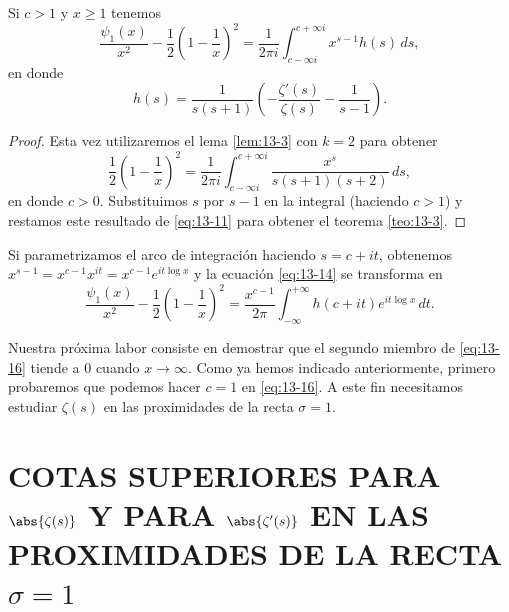     \begin{teorema}\label{teo:13-3}
        Si $c>1$ y $x\geq1$ tenemos
        \begin{equation}\label{eq:13-14}
            \frac{\psi_1(x)}{x^2}-\frac{1}{2}\left(1-\frac{1}{x}\right)^2=\frac{1}{2\pi i}\int_{c-\infty i}^{c+\infty i}x^{s-1}h(s)\,ds,
        \end{equation}
        en donde
        \begin{equation}\label{eq:13-15}
            h(s)=\frac{1}{s(s+1)}\left(-\frac{\zeta'(s)}{\zeta(s)}-\frac{1}{s-1}\right).
        \end{equation}
    \end{teorema}

    \begin{proof}
        Esta vez utilizaremos el lema \ref{lem:13-3} con $k=2$ para obtener
        \begin{equation*}
            \frac{1}{2}\left(1-\frac{1}{x}\right)^2=\frac{1}{2\pi i}\int_{c-\infty i}^{c+\infty i}\frac{x^s}{s(s+1)(s+2)}\,ds,
        \end{equation*}
        en donde $c>0$. Substituimos $s$ por $s-1$ en la integral (haciendo $c>1$) y restamos
        este resultado de \eqref{eq:13-11} para obtener el teorema \ref{teo:13-3}.
    \end{proof}

    Si parametrizamos el arco de integración haciendo $s=c+it$, obtenemos
    $x^{s-1}=x^{c-1}x^{it}=x^{c-1}e^{it\log x}$ y la ecuación \eqref{eq:13-14} se transforma
    en
    \begin{equation}\label{eq:13-16}
        \frac{\psi_1(x)}{x^2}-\frac{1}{2}\left(1-\frac{1}{x}\right)^2=\frac{x^{c-1}}{2\pi}\int_{-\infty}^{+\infty}h(c+it)e^{it\log x}\,dt.
    \end{equation}

    Nuestra próxima labor consiste en demostrar que el segundo miembro de
    \eqref{eq:13-16} tiende a 0 cuando $x\to\infty$. Como ya hemos indicado anteriormente,
    primero probaremos que podemos hacer $c=1$ en \eqref{eq:13-16}. A este fin necesitamos
    estudiar $\zeta(s)$ en las proximidades de la recta $\sigma=1$.

    \section[COTAS SUPERIORES PARA $\abs{\zeta(s)}$ Y PARA $\abs{\zeta'(s)}$ EN LAS PROXIMIDADES DE LA RECTA $\sigma=1$]{COTAS SUPERIORES PARA \texorpdfstring{$\abs{\zeta(s)}$}{|ζ(s)|} Y PARA \texorpdfstring{$\abs{\zeta'(s)}$}{|ζ'(s)|} EN LAS PROXIMIDADES DE LA RECTA \texorpdfstring{$\sigma=1$}{σ=1}}

